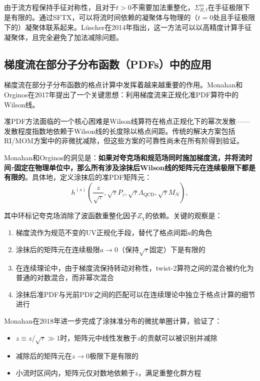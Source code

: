 \documentclass[12pt,a4paper]{ctexart}
\theoremstyle{definition}
\begin{document}
由于流方程保持手征对称性，且对于$t>0$不需要加法重整化，$\Sigma_{R,t}^{rr}$在手征极限下是有限的。通过SFTX，可以将流时间依赖的凝聚体与物理的（$t=0$处且手征极限下的）凝聚体联系起来。L\"uscher在2014年指出\cite{Luscher2014}，这一方法可以以高精度计算手征凝聚体，且完全避免了加法减除问题。

\subsection{梯度流在部分子分布函数（PDFs）中的应用}

梯度流在部分子分布函数的格点计算中发挥着越来越重要的作用。Monahan和Orginos在2017年提出了一个关键思想\cite{MonahanOrginos2017}：利用梯度流来正规化准PDF算符中的Wilson线。

准PDF方法面临的一个核心困难是Wilson线算符在格点正规化下的幂次发散——发散程度指数地依赖于Wilson线的长度除以格点间距。传统的解决方案包括RI/MOM方案中的非微扰减除，但这些方案的可靠性尚未在所有阶得到验证。

Monahan和Orginos的洞见是\cite{MonahanOrginos2017}：\textbf{如果对夸克场和规范场同时施加梯度流，并将流时间$\tau$固定在物理单位中，那么所有涉及涂抹后Wilson线的矩阵元在连续极限下都是有限的}。具体地，定义涂抹后的准PDF矩阵元：
\begin{equation}
h^{(s)}\left( \frac{z}{\sqrt{\tau}}, \sqrt{\tau}P_z, \sqrt{\tau}\Lambda_{\text{QCD}}, \sqrt{\tau}M_N \right),
\label{eq:smeared_quasi}
\end{equation}

其中环标记夸克场消除了波函数重整化因子$Z_\chi$的依赖。关键的观察是\cite{MonahanOrginos2017}：
\begin{enumerate}
    \item 梯度流作为规范不变的UV正规化手段，替代了格点间距$a$的角色
    \item 涂抹后的矩阵元在连续极限$a \to 0$（保持$\sqrt{\tau}$固定）下是有限的
    \item 在连续理论中，由于梯度流保持转动对称性，twist-2算符之间的混合被约化为普通的对数混合，而非幂次混合
    \item 涂抹后准PDF与光前PDF之间的匹配可以在连续理论中独立于格点计算的细节进行
\end{enumerate}

Monahan在2018年进一步完成了涂抹准分布的微扰单圈计算\cite{Monahan2018}，验证了：
\begin{itemize}
    \item $z \equiv z/\sqrt{\tau} \gg 1$时，矩阵元中线性发散于$z$的贡献可以被识别并减除
    \item 减除后的矩阵元在$z \to 0$极限下是有限的
    \item 小流时区间内，矩阵元仅对数地依赖于$z$，满足重整化群方程
\end{itemize}
\end{document}
